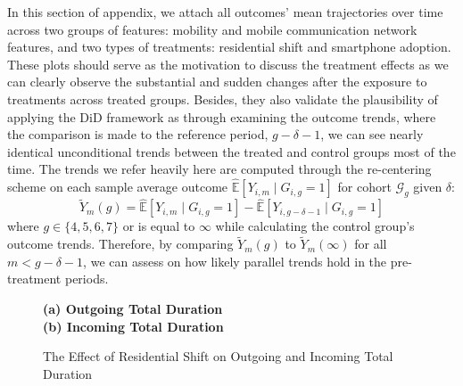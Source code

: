 
\label{appendix_event_centered_trends}

In this section of appendix, we attach all outcomes' mean trajectories over time across two groups of features: mobility and mobile communication network features, and two types of treatments: residential shift and smartphone adoption. These plots should serve as the motivation to discuss the treatment effects as we can clearly observe the substantial and sudden changes after the exposure to treatments across treated groups. Besides, they also validate the plausibility of applying the DiD framework as through examining the outcome trends, where the comparison is made to the reference period, $g-\delta-1$,
we can see nearly identical unconditional trends between the treated and control groups most of the time. The trends we refer heavily here are computed through the re-centering scheme on each sample average outcome $\hat{\mathbb{E}}[Y_{i, m} \mid G_{i, g} = 1]$ for cohort $\mathcal{G}_g$ given $\delta$:
$$
\tilde{Y}_{m}(g)
=
\hat{\mathbb{E}}[Y_{i, m} \mid G_{i, g} = 1]
-
\hat{\mathbb{E}}[Y_{i, g-\delta-1} \mid G_{i, g} = 1]
$$
where $g \in \{4, 5, 6, 7\}$ or is equal to $\infty$ while calculating the control group's outcome trends. Therefore, by comparing $\tilde{Y}_{m}(g)$ to $\tilde{Y}_{m}(\infty)$ for all $m < g-\delta-1$, we can assess on how likely parallel trends hold in the pre-treatment periods.

\begin{figure}[ht!]
\centering
\caption{The Effect of Residential Shift on Outgoing and Incoming Total Duration}
\vspace{0.3cm}

\textbf{(a) Outgoing Total Duration}\\


\vspace{0.3cm}
\textbf{(b) Incoming Total Duration}\\


\label{fig:effect_of_residential_shift_on_total_duration}
\end{figure}


